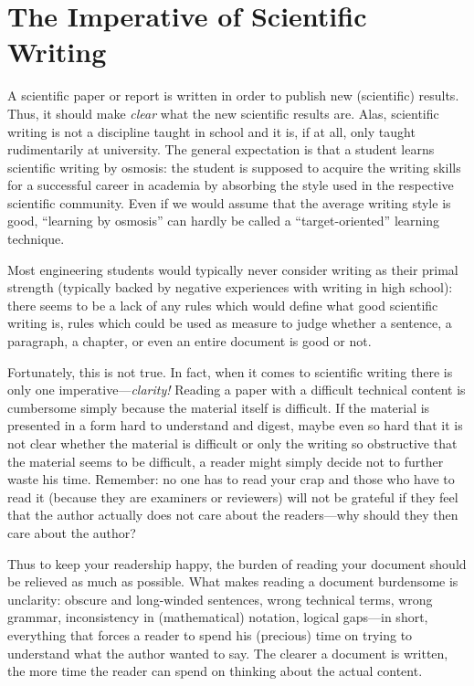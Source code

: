 \pagebreak %

\chapter{The Imperative of Scientific Writing} %
A scientific paper or report is written in order to publish new (scientific) results. 
Thus, it should make \emph{clear} what the new scientific results are.
Alas, scientific writing is not a discipline taught in school and it is, if at all, only taught rudimentarily at university.
The general expectation is that a student learns scientific writing by osmosis:
the student is supposed to acquire the writing skills for a successful career in academia by absorbing the style used in the respective scientific community.
Even if we would assume that the average writing style is good, ``learning by osmosis'' can hardly be called a ``target-oriented'' learning technique.

Most engineering students would typically never consider writing as their primal strength (typically backed by negative experiences with writing in high school): 
there seems to be a lack of any rules which would define what good scientific writing is, rules which could be used as measure to judge whether a sentence, a paragraph, a chapter, or even an entire document is good or not.

Fortunately, this is not true. 
In fact, when it comes to scientific writing there is only one imperative---\emph{clarity!}
Reading a paper with a difficult technical content is cumbersome simply because the material itself is difficult. 
If the material is presented in a form hard to understand and digest, maybe even so hard that it is not clear whether the material is difficult or only the writing so obstructive that the material seems to be difficult, a reader might simply decide not to further waste his time.
Remember: no one has to read your crap and those who have to read it (because they are examiners or reviewers) will not be grateful if they feel that the author actually does not care about the readers---why should they then care about the author?

Thus to keep your readership happy, the burden of reading your document should be relieved as much as possible. 
What makes reading a document burdensome is unclarity: 
obscure and long-winded sentences, wrong technical terms, wrong grammar, inconsistency in (mathematical) notation, logical gaps---in short, everything that forces a reader to spend his (precious) time on trying to understand what the author wanted to say.
The clearer a document is written, the more time the reader can spend on thinking about the actual content.

